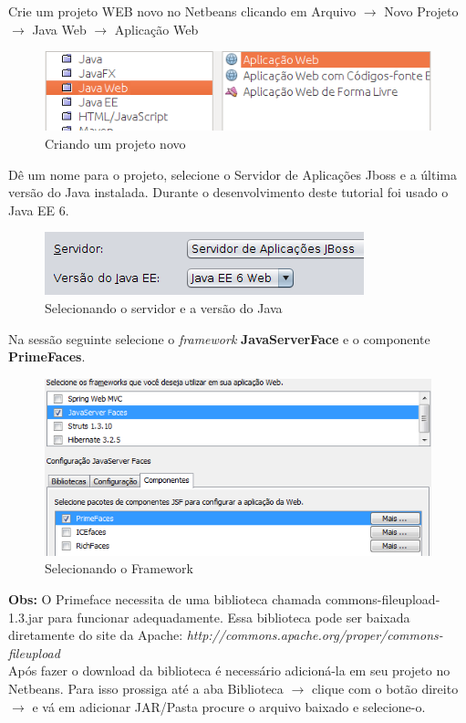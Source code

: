 \documentclass[12pt,a4paper]{article}
\begin{document}
Crie um projeto WEB novo no Netbeans clicando em Arquivo $\rightarrow$ Novo Projeto $\rightarrow$ Java Web $\rightarrow$ Aplicação Web

\begin{figure}[H]
    \centering
    \includegraphics[scale=0.60]{NovoProjetoWeb.png}
    \caption{Criando um projeto novo}
    \label{imagemNovoProjetoWeb}
\end{figure}

Dê um nome para o projeto, selecione o Servidor de Aplicações Jboss e a última versão do Java instalada. Durante o desenvolvimento deste tutorial foi usado o Java EE 6.

\begin{figure}[H]
    \centering
    \includegraphics[scale=0.60]{jboss.png}
    \caption{Selecionando o servidor e a versão do Java}
    \label{imagemServidorVersaoJava}
\end{figure}

Na sessão seguinte selecione o \textit{framework} \textbf{JavaServerFace} e o componente \textbf{PrimeFaces}.

\begin{figure}[H]
    \centering
    \includegraphics[scale=0.80]{SelectJavaServerFace.png}
    \caption{Selecionando o Framework}
    \label{imagemSelecionandoJavaServerFace}
\end{figure}

\textbf{Obs:} O Primeface necessita de uma biblioteca chamada commons-fileupload-1.3.jar para funcionar adequadamente. Essa biblioteca pode ser baixada diretamente do site da Apache:
\textit{http://commons.apache.org/proper/commons-fileupload}\\
Após fazer o download da biblioteca é necessário adicioná-la em seu projeto no Netbeans. Para isso prossiga até a aba Biblioteca $\rightarrow$ clique com o botão direito $\rightarrow$ e vá em adicionar JAR/Pasta procure o arquivo baixado e selecione-o.\\
\end{document}
